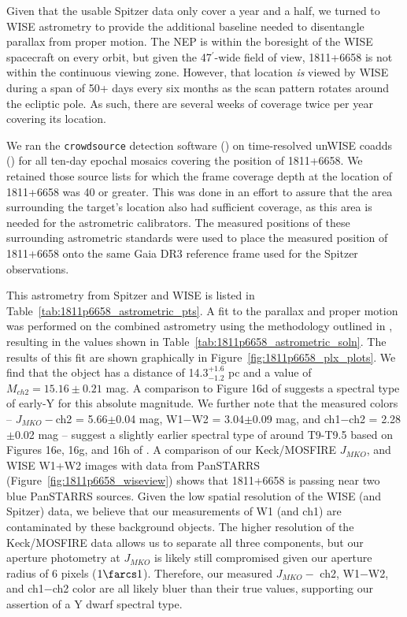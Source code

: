 \documentclass[twocolumn,tighten,twocolappendix]{aastex631}
\begin{document}
Given that the usable Spitzer data only cover a year and a half, we turned to WISE astrometry to provide the additional baseline needed to disentangle parallax from proper motion. The NEP is within the boresight of the WISE spacecraft on every orbit, but given the 47$^{\prime}$-wide field of view, 1811+6658 is not within the continuous viewing zone. However, that location {\it is} viewed by WISE during a span of 50+ days every six months as the scan pattern rotates around the ecliptic pole. As such, there are several weeks of coverage twice per year covering its location.

We ran the {\texttt{crowdsource}} detection software (\citealt{schlafly2018}) on time-resolved unWISE coadds (\citealt{meisner2018}) for all ten-day epochal mosaics covering the position of 1811+6658. We retained those source lists for which the frame coverage depth at the location of 1811+6658 was 40 or greater. This was done in an effort to assure that the area surrounding the target's location also had sufficient coverage, as this area is needed for the astrometric calibrators. The measured positions of these surrounding astrometric standards were used to place the measured position of 1811+6658 onto the same Gaia DR3 reference frame used for the Spitzer observations.

This astrometry from Spitzer and WISE is listed in Table~\ref{tab:1811p6658_astrometric_pts}. A fit to the parallax and proper motion was performed on the combined astrometry using the methodology outlined in \cite{kirkpatrick2021}, resulting in the values shown in Table~\ref{tab:1811p6658_astrometric_soln}. The results of this fit are shown graphically in Figure~\ref{fig:1811p6658_plx_plots}. We find that the object has a distance of 14.3$^{+1.6}_{-1.2}$ pc and a value of $M_{ch2} = 15.16{\pm}0.21$ mag. A comparison to Figure 16d of \cite{kirkpatrick2021} suggests a spectral type of early-Y for this absolute magnitude. We further note that the measured colors -- $J_{MKO} -$ch2 = 5.66$\pm$0.04 mag, W1$-$W2 = 3.04$\pm$0.09 mag, and ch1$-$ch2 = 2.28$\pm$0.02 mag -- suggest a slightly earlier spectral type of around T9-T9.5 based on Figures 16e, 16g, and 16h of \cite{kirkpatrick2021}. A comparison of our Keck/MOSFIRE $J_{MKO}$, and WISE W1+W2 images with data from PanSTARRS (Figure~\ref{fig:1811p6658_wiseview}) shows that 1811+6658 is passing near two blue PanSTARRS sources. Given the low spatial resolution of the WISE (and Spitzer) data, we believe that our measurements of W1 (and ch1) are contaminated by these background objects. The higher resolution of the Keck/MOSFIRE data allows us to separate all three components, but our aperture photometry at $J_{MKO}$ is likely still compromised given our aperture radius of 6 pixels ($1{\farcs}1$). Therefore, our measured 
$J_{MKO} -$ ch2, W1$-$W2, and ch1$-$ch2 color are all likely bluer than their true values, supporting our assertion of a Y dwarf spectral type. 
\end{document}
